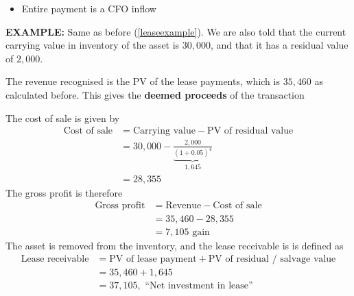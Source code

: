 \documentclass[../notes_compiled.tex]{subfiles}
\begin{document}
\begin{itemize}
\begin{itemize}
\item Entire payment is a CFO inflow
\end{itemize}
{\color{RedViolet}
\item[] \textbf{EXAMPLE:} Same as before (\ref{leaseexample}). We are also told that the current carrying value in inventory of the asset is $30,000$, and that it has a residual value of $2,000$.
}
{\color{RoyalBlue}
\item The revenue recognised is the PV of the lease payments, which is $35,460$ as calculated before. This gives the \textbf{deemed proceeds} of the transaction
\item The cost of sale is given by
\begin{align*}
\text{Cost of sale} &= \text{Carrying value} - \text{PV of residual value} \\
&= 30,000 - \underbrace{\frac{2,000}{(1+0.05)^{4}}}_{1,645} \\
&=28,355
\end{align*}
The gross profit is therefore
\begin{align*}
\text{Gross profit} &= \text{Revenue} - \text{Cost of sale} \\
&=35,460 - 28,355 \\
&= 7,105 \text{ gain}
\end{align*}
The asset is removed from the inventory, and the lease receivable is is defined as
\begin{align*}
\text{Lease receivable} &= \text{PV of lease payment} + \text{PV of residual / salvage value} \\
&=35,460 + 1,645 \\
&=37,105, \text{ ``Net investment in lease''}
\end{align*}

\newpage

}
\end{itemize}
\end{document}
